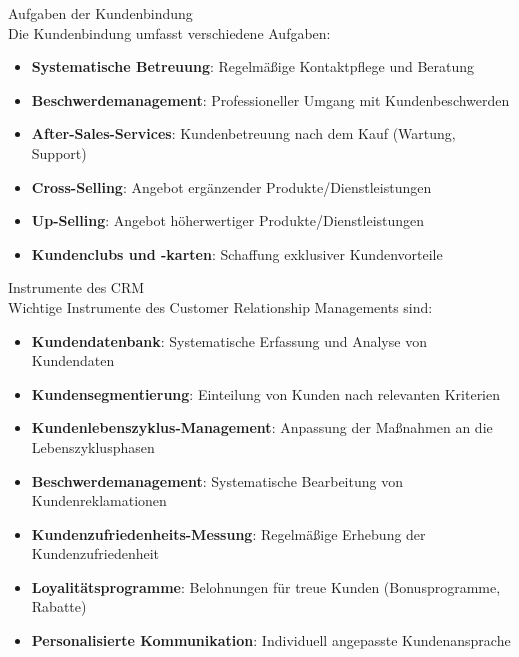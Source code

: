 \begin{definition}{Aufgaben der Kundenbindung}\\
Die Kundenbindung umfasst verschiedene Aufgaben:
\begin{itemize}
    \item \textbf{Systematische Betreuung}: Regelmäßige Kontaktpflege und Beratung
    \item \textbf{Beschwerdemanagement}: Professioneller Umgang mit Kundenbeschwerden
    \item \textbf{After-Sales-Services}: Kundenbetreuung nach dem Kauf (Wartung, Support)
    \item \textbf{Cross-Selling}: Angebot ergänzender Produkte/Dienstleistungen
    \item \textbf{Up-Selling}: Angebot höherwertiger Produkte/Dienstleistungen
    \item \textbf{Kundenclubs und -karten}: Schaffung exklusiver Kundenvorteile
\end{itemize}
\end{definition}

\begin{definition}{Instrumente des CRM}\\
Wichtige Instrumente des Customer Relationship Managements sind:
\begin{itemize}
    \item \textbf{Kundendatenbank}: Systematische Erfassung und Analyse von Kundendaten
    \item \textbf{Kundensegmentierung}: Einteilung von Kunden nach relevanten Kriterien
    \item \textbf{Kundenlebenszyklus-Management}: Anpassung der Maßnahmen an die Lebenszyklusphasen
    \item \textbf{Beschwerdemanagement}: Systematische Bearbeitung von Kundenreklamationen
    \item \textbf{Kundenzufriedenheits-Messung}: Regelmäßige Erhebung der Kundenzufriedenheit
    \item \textbf{Loyalitätsprogramme}: Belohnungen für treue Kunden (Bonusprogramme, Rabatte)
    \item \textbf{Personalisierte Kommunikation}: Individuell angepasste Kundenansprache
\end{itemize}
\end{definition}

